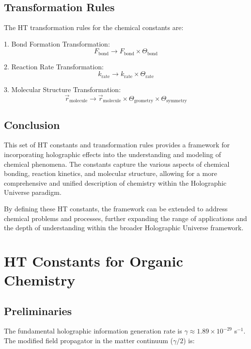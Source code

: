 \documentclass{article}
\theoremstyle{plain}
\theoremstyle{definition}
\theoremstyle{remark}
\begin{document}
\subsection{Transformation Rules}

The HT transformation rules for the chemical constants are:

1. Bond Formation Transformation:
   \begin{equation}
   F_\text{bond} \rightarrow F_\text{bond} \times \Theta_\text{bond}
   \end{equation}

2. Reaction Rate Transformation:
   \begin{equation}
   k_\text{rate} \rightarrow k_\text{rate} \times \Theta_\text{rate}
   \end{equation}

3. Molecular Structure Transformation:
   \begin{equation}
   \vec{r}_\text{molecule} \rightarrow \vec{r}_\text{molecule} \times \Theta_\text{geometry} \times \Theta_\text{symmetry}
   \end{equation}

\subsection{Conclusion}

This set of HT constants and transformation rules provides a framework for incorporating holographic effects into the understanding and modeling of chemical phenomena. The constants capture the various aspects of chemical bonding, reaction kinetics, and molecular structure, allowing for a more comprehensive and unified description of chemistry within the Holographic Universe paradigm.

By defining these HT constants, the framework can be extended to address chemical problems and processes, further expanding the range of applications and the depth of understanding within the broader Holographic Universe framework.

\section{HT Constants for Organic Chemistry}

\subsection{Preliminaries}

The fundamental holographic information generation rate is $\gamma \approx 1.89 \times 10^{-29}$ s$^{-1}$. The modified field propagator in the matter continuum ($\gamma/2$) is:
\end{document}
